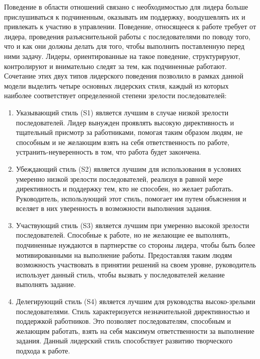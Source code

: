 \documentclass[a4paper,12pt,oneside,final]{extarticle}
\numberwithin{equation}{section}
\begin{document}
\begin{enumerate}
Поведение в области отношений связано с необходимостью для лидера больше прислушиваться к подчиненным, оказывать им поддержку, воодушевлять их и привлекать к участию в управлении. 
Поведение, относящееся к работе требует от лидера, проведения разъяснительной работы с последователями по поводу того, что и как они должны делать для того, чтобы выполнить поставленную перед ними задачу. 
Лидеры, ориентированные на такое поведение, структурируют, контролируют и внимательно следят за тем, как подчиненные работают. 
Сочетание этих двух типов лидерского поведения позволило в рамках данной модели выделить четыре основных лидерских стиля, каждый из которых наиболее соответствует определенной степени зрелости последователей:
\begin{enumerate}
	\item Указывающий стиль (S1) является лучшим в случае низкой зрелости последователей. 
	Лидер вынужден проявлять высокую директивность и тщательный присмотр за работниками, помогая таким образом людям, не способным и не желающим взять на себя ответственность по работе, устранить-неуверенность в том, что работа будет закончена.
	\item Убеждающий стиль (S2) является лучшим для использования в условиях умеренно низкой зрелости последователей, реализуя в равной мере директивность и поддержку тем, кто не способен, но желает работать. 
	Руководитель, использующий этот стиль, помогает им путем объяснения и вселяет в них уверенность в возможности выполнения задания.
	\item Участвующий стиль (S3) является лучшим при умеренно высокой зрелости последователей. 
	Способные к работе, но не желающие ее выполнять, подчиненные нуждаются в партнерстве со стороны лидера, чтобы быть более мотивированными на выполнение работы. 
	Предоставляя таким людям возможность участвовать в принятии решений на своем уровне, руководитель использует данный стиль, чтобы вызвать у последователей желание выполнять задание.
	\item Делегирующий стиль (S4) является лучшим для руководства высоко-зрелыми последователями. 
	Стиль характеризуется незначительной директивностью и поддержкой работников. 
	Это позволяет последователям, способным и желающим работать, взять на себя максимум ответственности за выполнение задания. 
	Данный лидерский стиль способствует развитию творческого подхода к работе.
\end{enumerate}


\end{enumerate}
\end{document}
